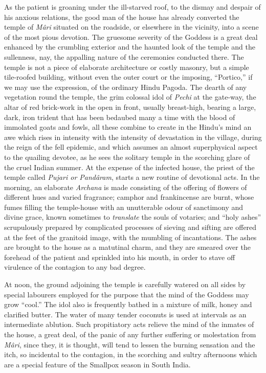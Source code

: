 \documentclass[a4paper, 12pt, oneside, english]{article}
\begin{document}
As the patient is groaning under the ill-starved roof, to the dismay and despair of his anxious relations, the good man of the house has already converted the temple of \emph{Mâri} situated on the roadside, or elsewhere in the vicinity, into a scene of the most pious devotion. The gruesome severity of the Goddess is a great deal enhanced by the crumbling exterior and the haunted look of the temple and the sullenness, nay, the appalling nature of the ceremonies conducted there. The temple is not a piece of elaborate architecture or costly masonry, but a simple tile-roofed building, without even the outer court or the imposing, ``Portico,'' if we may use the expression, of the ordinary Hindu Pagoda. The dearth of any vegetation round the temple, the grim colossal idol of \emph{Pechi} at the gate-way, the altar of red brick-work in the open in front, usually breast-high, bearing a large, dark, iron trident that has been bedaubed many a time with the blood of immolated goats and fowls, all these combine to create in the Hindu's mind an awe which rises in intensity with the intensity of devastation in the village, during the reign of the fell epidemic, and which assumes an almost superphysical aspect to the quailing devotee, as he sees the solitary temple in the scorching glare of the cruel Indian summer. At the expense of the infected house, the priest of the temple called \emph{Pujari or Pandâram}, starts a new routine of devotional acts. In the morning, an elaborate \emph{Archana} is made consisting of the offering of flowers of different hues and varied fragrance; camphor and frankincense are burnt, whose fumes filling the temple-house with an unutterable odour of sanctimony and divine grace, known sometimes to \emph{translate} the souls of votaries; and ``holy ashes'' scrupulously prepared by complicated processes of sieving and sifting are offered at the feet of the granitoid image, with the mumbling of incantations. The ashes are brought to the house as a matutinal charm, and they are smeared over the forehead of the patient and sprinkled into his mouth, in order to stave off virulence of the contagion to any bad degree.

At noon, the ground adjoining the temple is carefully watered on all sides by special labourers employed for the purpose that the mind of the Goddess may grow ``cool.'' The idol also is frequently bathed in a mixture of milk, honey and clarified butter. The water of many tender coconuts is used at intervals as an intermediate ablution. Such propitiatory acts relieve the mind of the inmates of the house, a great deal, of the panic of any further suffering or molestation from \emph{Mâri}, since they, it is thought, will tend to lessen the burning sensation and the itch, so incidental to the contagion, in the scorching and sultry afternoons which are a special feature of the Smallpox season in South India.
\end{document}
